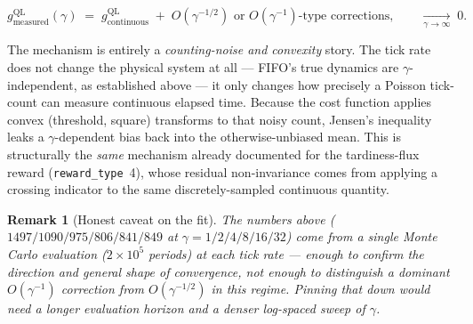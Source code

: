 \documentclass[11pt,a4paper]{article}
\newtheorem{remark}{Remark}
\begin{document}
\begin{equation}
  g^{\text{QL}}_{\text{measured}}(\gamma)
  \;=\;
  g^{\text{QL}}_{\text{continuous}}
  \;+\; O\!\left(\gamma^{-1/2}\right) \text{ or } O\!\left(\gamma^{-1}\right)
  \text{-type corrections},
  \qquad
  \xrightarrow[\gamma\to\infty]{} \; 0.
\end{equation}

The mechanism is entirely a \emph{counting-noise and convexity} story.  The
tick rate does not change the physical system at all --- FIFO's true dynamics
are $\gamma$-independent, as established above --- it only changes how
precisely a Poisson tick-count can measure continuous elapsed time.  Because
the cost function applies convex (threshold, square) transforms to that noisy
count, Jensen's inequality leaks a $\gamma$-dependent bias back into the
otherwise-unbiased mean.  This is structurally the \emph{same} mechanism
already documented for the tardiness-flux reward (\texttt{reward\_type}~4),
whose residual non-invariance comes from applying a crossing indicator to the
same discretely-sampled continuous quantity.

\begin{remark}[Honest caveat on the fit]
The numbers above ($1497/1090/975/806/841/849$ at
$\gamma=1/2/4/8/16/32$) come from a single Monte Carlo evaluation
($2\times10^5$ periods) at each tick rate --- enough to confirm the direction
and general shape of convergence, not enough to distinguish a
dominant $O(\gamma^{-1})$ correction from $O(\gamma^{-1/2})$ in this regime.
Pinning that down would need a longer evaluation horizon and a denser
log-spaced sweep of $\gamma$.
\end{remark}
\end{document}
